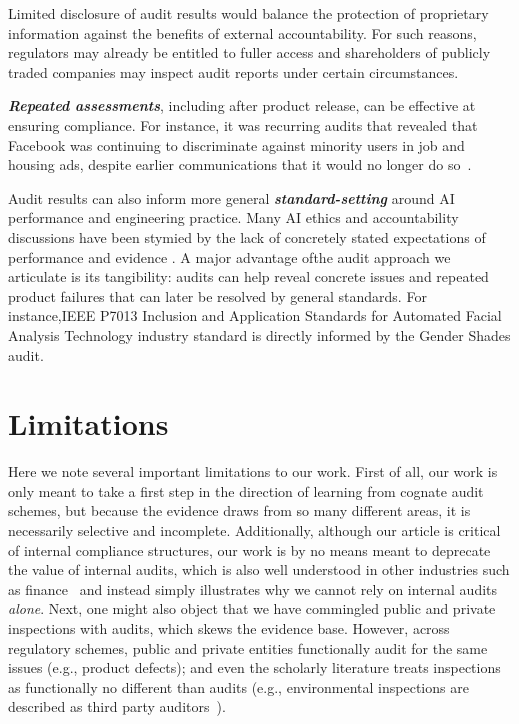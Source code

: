 \documentclass[sigconf]{acmart}
\begin{document}
Limited disclosure of audit results would balance the protection of proprietary information against the benefits of external accountability. For such reasons, regulators may already be entitled to fuller access and shareholders of publicly traded companies may inspect audit reports under certain circumstances.

\textbf{\textit{Repeated assessments}}, including after product release, can be effective at ensuring compliance. For instance, it was recurring audits that revealed that Facebook was 
continuing to discriminate against minority users in job and housing ads,
despite earlier communications 
that it would no longer do so~\cite{kingsley2020auditing,merrill2020does,ali2019discrimination,kaufman,sapiezynski2019algorithms}.

Audit results can also inform more general \textbf{\textit{standard-setting}} around AI performance and engineering practice. Many AI ethics and accountability discussions have been stymied by the lack of concretely stated expectations of performance and evidence \cite{mittelstadt2019principles}. A major advantage ofthe audit approach we articulate is its tangibility: audits can help reveal concrete issues and repeated product failures that can later be resolved by general standards. For instance,IEEE P7013 Inclusion and Application Standards for Automated Facial Analysis Technology industry standard is directly informed by the Gender Shades audit. 
\section{Limitations}

Here we note several important limitations to our work. First of all, 
our work is only meant to take a first step in the direction of learning from cognate audit schemes, but because the evidence draws from so many different areas, it is necessarily selective and incomplete. 
Additionally, although our article is critical of internal compliance structures, our work is by no means meant to deprecate the value of internal audits, which is also well understood in other industries such as finance~\cite{bedard2010strengthening} 
and instead simply illustrates why we cannot rely on internal audits \emph{alone}.
Next, one might also object that we have commingled public and private inspections with audits, which skews the evidence base.
However, across regulatory schemes, public and private entities functionally audit for the same issues (e.g., product defects); and even the scholarly literature treats inspections as functionally no different than audits (e.g., environmental inspections are described as third party auditors~\cite{duflo2013truth}). 
\end{document}
